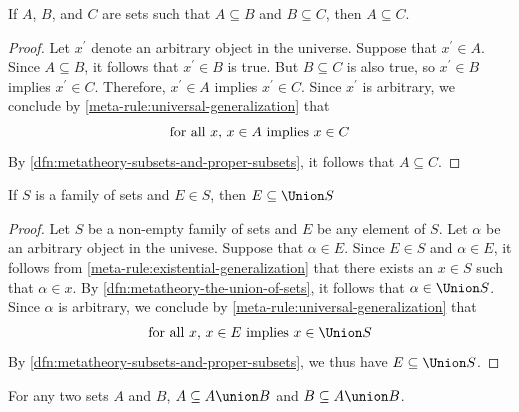 \begin{thm}
     \label{thm:metatheory-transitivity-of-subset-relation}
    If \( A \), \( B \), and \( C \) are sets such that \( A \subseteq B \) and \( B \subseteq C \), then \( A \subseteq C \).
\end{thm}

\begin{proof}
    Let \( x^{\prime} \) denote an arbitrary object in the universe.
    Suppose that \( x^{\prime} \in A \).
    Since \( A \subseteq B \), it follows that \( x^{\prime} \in B \) is true.
    But \( B \subseteq C \) is also true, so \( x^{\prime} \in B \) implies \( x^{\prime} \in C \).
    Therefore, \( x^{\prime} \in A \) implies \( x^{\prime} \in C \).
    Since \( x^{\prime} \) is arbitrary,  we conclude by \cref{meta-rule:universal-generalization} that
    \begin{equation*}
        \text{for all \( x \), \( x \in A \) implies \( x \in C \)}
    \end{equation*}
    By \cref{dfn:metatheory-subsets-and-proper-subsets}, it follows that \( A \subseteq C \).
\end{proof}

\begin{thm}
     \label{thm:metatheory-any-member-of-a-family-of-sets-is-a-subset-of-the-union-of-the-family-of-sets}
    If \( S \) is a family of sets and \( E \in S \), then \( E \subseteq \Union S \)
\end{thm}

\begin{proof}
    Let \( S \) be a non-empty family of sets and \( E \) be any element of \( S \).
    Let \( \alpha \) be an arbitrary object in the univese.
    Suppose that \( \alpha \in E \).
    Since \( E \in S \) and \( \alpha \in E \), it follows from \cref{meta-rule:existential-generalization} that
    there exists an \( x \in S \) such that \( \alpha \in x \).
    By \cref{dfn:metatheory-the-union-of-sets}, it follows that \( \alpha \in \Union S \).
    Since \( \alpha \) is arbitrary, we conclude by \cref{meta-rule:universal-generalization} that
    \begin{equation*}
        \text{for all \( x \), \( x \in E \) implies \( x \in \Union S \)}
    \end{equation*}
    By \cref{dfn:metatheory-subsets-and-proper-subsets}, we thus have \( E \subseteq \Union S \).
\end{proof}

\begin{cor}
     \label{cor:metatheory-A-and-B-are-both-subsets-of-A-union-B}
    For any two sets \( A \) and \( B \), \( A \subseteq A \union B \) and \( B \subseteq A \union B \).
\end{cor}

